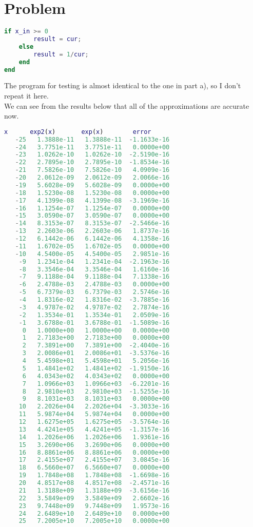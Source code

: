 \documentclass[11pt]{article}
\newcommand{\enterProblemHeader}[1]{
}
\newcommand{\exitProblemHeader}[1]{
}
\newcounter{homeworkProblemCounter} %
\newcommand{\homeworkProblemName}{}
\newenvironment{homeworkProblem}[1][Problem \arabic{homeworkProblemCounter}]{ %
\stepcounter{homeworkProblemCounter} %
\renewcommand{\homeworkProblemName}{#1} %
\section{\homeworkProblemName} %
\enterProblemHeader{\homeworkProblemName} %
}{
\exitProblemHeader{\homeworkProblemName} %
}
\begin{document}
\begin{homeworkProblem}
\begin{framed}
\begin{lstlisting}[language=matlab]
    if x_in >= 0
        result = cur;
    else
        result = 1/cur;
    end
end
\end{lstlisting}
\end{framed}
The program for testing is almost identical to the one in part a), so I don't repeat it here.\\
We can see from the results below that all of the approximations are accurate now.
\begin{framed}
\begin{lstlisting}[language=matlab]
     x      exp2(x)       exp(x)        error
   -25   1.3888e-11   1.3888e-11  -1.1633e-16
   -24   3.7751e-11   3.7751e-11   0.0000e+00
   -23   1.0262e-10   1.0262e-10  -2.5190e-16
   -22   2.7895e-10   2.7895e-10  -1.8534e-16
   -21   7.5826e-10   7.5826e-10   4.0909e-16
   -20   2.0612e-09   2.0612e-09   2.0066e-16
   -19   5.6028e-09   5.6028e-09   0.0000e+00
   -18   1.5230e-08   1.5230e-08   0.0000e+00
   -17   4.1399e-08   4.1399e-08  -3.1969e-16
   -16   1.1254e-07   1.1254e-07   0.0000e+00
   -15   3.0590e-07   3.0590e-07   0.0000e+00
   -14   8.3153e-07   8.3153e-07  -2.5466e-16
   -13   2.2603e-06   2.2603e-06   1.8737e-16
   -12   6.1442e-06   6.1442e-06   4.1358e-16
   -11   1.6702e-05   1.6702e-05   0.0000e+00
   -10   4.5400e-05   4.5400e-05   2.9851e-16
    -9   1.2341e-04   1.2341e-04  -2.1963e-16
    -8   3.3546e-04   3.3546e-04   1.6160e-16
    -7   9.1188e-04   9.1188e-04   7.1338e-16
    -6   2.4788e-03   2.4788e-03   0.0000e+00
    -5   6.7379e-03   6.7379e-03   2.5746e-16
    -4   1.8316e-02   1.8316e-02  -3.7885e-16
    -3   4.9787e-02   4.9787e-02   2.7874e-16
    -2   1.3534e-01   1.3534e-01   2.0509e-16
    -1   3.6788e-01   3.6788e-01  -1.5089e-16
     0   1.0000e+00   1.0000e+00   0.0000e+00
     1   2.7183e+00   2.7183e+00   0.0000e+00
     2   7.3891e+00   7.3891e+00  -2.4040e-16
     3   2.0086e+01   2.0086e+01  -3.5376e-16
     4   5.4598e+01   5.4598e+01   5.2056e-16
     5   1.4841e+02   1.4841e+02  -1.9150e-16
     6   4.0343e+02   4.0343e+02   0.0000e+00
     7   1.0966e+03   1.0966e+03  -6.2201e-16
     8   2.9810e+03   2.9810e+03  -1.5255e-16
     9   8.1031e+03   8.1031e+03   0.0000e+00
    10   2.2026e+04   2.2026e+04  -3.3033e-16
    11   5.9874e+04   5.9874e+04   0.0000e+00
    12   1.6275e+05   1.6275e+05  -3.5764e-16
    13   4.4241e+05   4.4241e+05  -1.3157e-16
    14   1.2026e+06   1.2026e+06   1.9361e-16
    15   3.2690e+06   3.2690e+06   0.0000e+00
    16   8.8861e+06   8.8861e+06   0.0000e+00
    17   2.4155e+07   2.4155e+07   3.0845e-16
    18   6.5660e+07   6.5660e+07   0.0000e+00
    19   1.7848e+08   1.7848e+08  -1.6698e-16
    20   4.8517e+08   4.8517e+08  -2.4571e-16
    21   1.3188e+09   1.3188e+09  -3.6156e-16
    22   3.5849e+09   3.5849e+09   2.6602e-16
    23   9.7448e+09   9.7448e+09   1.9573e-16
    24   2.6489e+10   2.6489e+10   0.0000e+00
    25   7.2005e+10   7.2005e+10   0.0000e+00
\end{lstlisting}
\end{framed}
\end{homeworkProblem}
\clearpage

\end{document}

